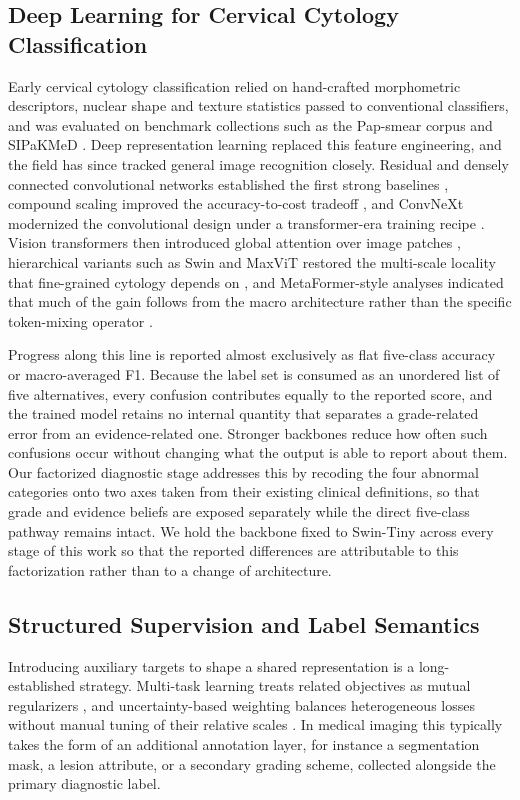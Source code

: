 \documentclass[conference]{IEEEtran}
\begin{document}
\subsection{Deep Learning for Cervical Cytology Classification}
\label{sec:rw_backbone}
Early cervical cytology classification relied on hand-crafted morphometric descriptors, nuclear shape and texture statistics passed to conventional classifiers, and was evaluated on benchmark collections such as the Pap-smear corpus and SIPaKMeD \cite{jantzen2005pap,plissiti2018sipakmed}. Deep representation learning replaced this feature engineering, and the field has since tracked general image recognition closely. Residual and densely connected convolutional networks established the first strong baselines \cite{he2016deep,huang2017densenet}, compound scaling improved the accuracy-to-cost tradeoff \cite{tan2019efficientnet}, and ConvNeXt modernized the convolutional design under a transformer-era training recipe \cite{liu2022convnext}. Vision transformers then introduced global attention over image patches \cite{dosovitsky2021vit}, hierarchical variants such as Swin and MaxViT restored the multi-scale locality that fine-grained cytology depends on \cite{liu2021swin,tu2022maxvit}, and MetaFormer-style analyses indicated that much of the gain follows from the macro architecture rather than the specific token-mixing operator \cite{yu2022metaformer}.

Progress along this line is reported almost exclusively as flat five-class accuracy or macro-averaged F1. Because the label set is consumed as an unordered list of five alternatives, every confusion contributes equally to the reported score, and the trained model retains no internal quantity that separates a grade-related error from an evidence-related one. Stronger backbones reduce how often such confusions occur without changing what the output is able to report about them. Our factorized diagnostic stage addresses this by recoding the four abnormal categories onto two axes taken from their existing clinical definitions, so that grade and evidence beliefs are exposed separately while the direct five-class pathway remains intact. We hold the backbone fixed to Swin-Tiny across every stage of this work so that the reported differences are attributable to this factorization rather than to a change of architecture.

\subsection{Structured Supervision and Label Semantics}
\label{sec:rw_multitask}
Introducing auxiliary targets to shape a shared representation is a long-established strategy. Multi-task learning treats related objectives as mutual regularizers \cite{caruana1997multitask}, and uncertainty-based weighting balances heterogeneous losses without manual tuning of their relative scales \cite{kendall2018multitask}. In medical imaging this typically takes the form of an additional annotation layer, for instance a segmentation mask, a lesion attribute, or a secondary grading scheme, collected alongside the primary diagnostic label.
\end{document}
